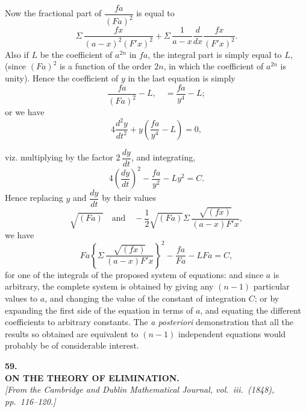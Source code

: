 \documentclass[11pt]{article}
\begin{document}
\medskip
Now the fractional part of $\dfrac{f a}{(F a)^{2}}$ is equal to
\[
\Sigma\,\frac{f x}{(a-x)^{2}(F'x)^{2}}
+ \Sigma\,\frac{1}{a-x}\frac{d}{d x}\frac{f x}{(F'x)^{2}}.
\]
Also if $L$ be the coefficient of $a^{2n}$ in $f a$, the integral part is simply equal to $L$,
(since $(F a)^{2}$ is a function of the order $2n$, in which the coefficient of $a^{2n}$ is unity).
Hence the coefficient of $y$ in the last equation is simply
\[
\frac{f a}{(F a)^{2}} - L,\quad = \frac{f a}{y^{4}} - L;
\]
or we have
\[
4\frac{d^{2}y}{d t^{2}} + y\left(\frac{f a}{y^{4}} - L\right) = 0,
\]

\bigskip

\noindent viz. multiplying by the factor $2\,\dfrac{d y}{d t}$, and integrating,
\[
4\left(\frac{d y}{d t}\right)^{2} - \frac{f a}{y^{2}} - Ly^{2} = C.
\]
Hence replacing $y$ and $\dfrac{d y}{d t}$ by their values
\[
\sqrt{(F a)}\quad\text{and}\quad
-\frac{1}{2}\sqrt{(F a)}\Sigma\,\frac{\sqrt{(f x)}}{(a-x)F'x},
\]
we have
\[
F a\left\{\Sigma\,\frac{\sqrt{(f x)}}{(a-x)F'x}\right\}^{2}
- \frac{f a}{F a} - LFa = C,
\]
for one of the integrals of the proposed system of equations: and since $a$ is arbitrary,
the complete system is obtained by giving any $(n - 1)$ particular values to $a$, and
changing the value of the constant of integration $C$; or by expanding the first side
of the equation in terms of $a$, and equating the different coefficients to arbitrary
constants. The \textit{a posteriori} demonstration that all the results so obtained are equivalent
to $(n - 1)$ independent equations would probably be of considerable interest.

\bigskip

\begin{center}
\textbf{\large 59.}\\[0.7em]
\textbf{\large ON THE THEORY OF ELIMINATION.}\\[0.5em]
\textit{[From the Cambridge and Dublin Mathematical Journal, vol.~iii.\ (1848), pp.~116--120.]}
\end{center}

\medskip
\end{document}

